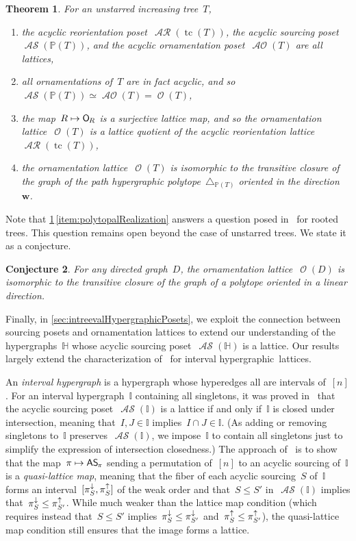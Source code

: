 \documentclass{amsart}
\newtheorem{theorem}{Theorem}[section]
\newtheorem{conjecture}[theorem]{Conjecture}
\theoremstyle{definition}
\renewcommand{\b}[1]{\boldsymbol{#1}} %
\renewcommand{\c}[1]{\mathcal{#1}} %
\newcommand{\simplex}{\triangle} %
\DeclareMathOperator{\tc}{tc} %
\newcommand{\darkblue}{\color{darkblue}} %
\newcommand{\defn}[1]{\textsl{\darkblue #1}} %
\newcommand{\projDown}[1]{\smash{\pi^\downarrow_{#1}}} %
\newcommand{\projUp}[1]{\smash{\pi^\uparrow_{#1}}} %
\newcommand{\mymap}[2]{\mathsf{#1}_{\hspace{-.7pt}#2}}
\DeclareMathOperator{\Orn}{\c{O}}  %
\newcommand{\orn}[1]{\mymap{O}{#1}}  %
\DeclareMathOperator{\AOrn}{\c{AO}}  %
\DeclareMathOperator{\AReori}{\c{AR}}  %
\DeclareMathOperator{\ASour}{\mathcal{AS}}  %
\newcommand{\asour}[1]{\mymap{AS}{#1}}  %
\newcommand{\HH}{\mathbb H}  %
\newcommand{\II}{\mathbb I} %
\newcommand{\PP}{\mathbb P} %
\begin{document}
\begin{theorem}
\label{thm:main2}
For an unstarred increasing tree~$T$,
\begin{enumerate}
\item the acyclic reorientation poset~$\AReori(\tc(T))$, the acyclic sourcing poset~$\ASour(\PP(T))$, and the acyclic ornamentation poset~$\AOrn(T)$ are all lattices,
\item all ornamentations of~$T$ are in fact acyclic, and so~$\ASour(\PP(T)) \simeq \AOrn(T) = \Orn(T)$,
\item the map~$R \mapsto \orn{R}$ is a surjective lattice map, and so the ornamentation lattice~$\Orn(T)$ is a lattice quotient of the acyclic reorientation lattice~$\AReori(\tc(T))$,
\item the ornamentation lattice~$\Orn(T)$ is isomorphic to the transitive closure of the graph of the path hypergraphic polytope~$\simplex_{\PP(T)}$ oriented in the direction~$\b{w}$. \label{item:polytopalRealization}
\end{enumerate}
\end{theorem}

Note that \cref{thm:main2}\,\eqref{item:polytopalRealization} answers a question posed in~\cite{DefantSack} for rooted trees.
This question remains open beyond the case of unstarred trees.
We state it as a conjecture.

\begin{conjecture}
For any directed graph~$D$, the ornamentation lattice~$\Orn(D)$ is isomorphic to the transitive closure of the graph of a polytope oriented in a linear direction.
\end{conjecture}

Finally, in \cref{sec:intreevalHypergraphicPosets}, we exploit the connection between sourcing posets and ornamentation lattices to extend our understanding of the hypergraphs~$\HH$ whose acyclic sourcing poset~$\ASour(\HH)$ is a lattice.
Our results largely extend the characterization of~\cite{BergeronPilaud} for interval hypergraphic~lattices.

An \defn{interval hypergraph} is a hypergraph whose hyperedges all are intervals of~$[n]$.
For an interval hypergraph~$\II$ containing all singletons, it was proved in~\cite[Thm.~A]{BergeronPilaud} that the acyclic sourcing poset~$\ASour(\II)$ is a lattice if and only if~$\II$ is closed under intersection, meaning that~$I,J \in \II$ implies~$I \cap J \in \II$.
(As adding or removing singletons to~$\II$ preserves~$\ASour(\II)$, we impose~$\II$ to contain all singletons just to simplify the expression of intersection closedness.)
The approach of~\cite{BergeronPilaud} is to show that the map~$\pi \mapsto \asour{\pi}$ sending a permutation of~$[n]$ to an acyclic sourcing of~$\II$ is a \defn{quasi-lattice map}, meaning that the fiber of each acyclic sourcing~$S$ of~$\II$ forms an interval~$[\projDown{S}, \projUp{S}]$ of the weak order and that~$S \le S'$ in~$\ASour(\II)$ implies that~$\projDown{S} \le \projUp{S'}$.
While much weaker than the lattice map condition (which requires instead that~$S \le S'$ implies~$\projDown{S} \le \projDown{S'}$ and~$\projUp{S} \le \projUp{S'}$), the quasi-lattice map condition still ensures that the image forms a lattice.
\end{document}
